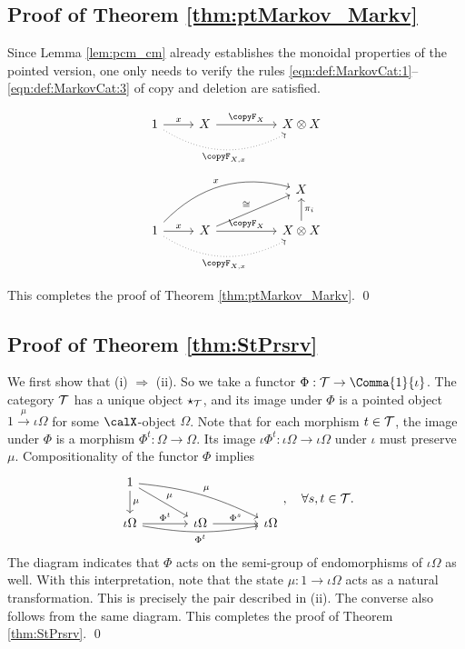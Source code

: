 \documentclass[12pt,oneside,pb-diagram]{article}
\begin{document}
\subsection{Proof of Theorem \ref{thm:ptMarkov_Markv}} \label{sec:proof:ptMarkov_Markv}

Since Lemma \ref{lem:pcm_cm} already establishes the monoidal properties of the pointed version, one only needs to verify the rules \eqref{eqn:def:MarkovCat:1}--\eqref{eqn:def:MarkovCat:3} of copy and deletion are  satisfied.

%
\[\begin{tikzcd}
	1 \arrow[r, "x"] \arrow[rrr, "{\copyF_{X,x}}"', dotted, bend right] & X \arrow[rr, "\copyF_X"] &  & X\otimes X
\end{tikzcd}\]
%
%
\[\begin{tikzcd}
	&  &  & X \\
	1 \arrow[r, "x"] \arrow[rrr, "{\copyF_{X,x}}"', dotted, bend right] \arrow[rrru, "x", bend left] & X \arrow[rr, "\copyF_X"] \arrow[rru, "\cong"] &  & X\otimes X \arrow[u, "\pi_{i}"']
\end{tikzcd}\]
%

This completes the proof of Theorem \ref{thm:ptMarkov_Markv}. \qed
\subsection{Proof of Theorem \ref{thm:StPrsrv}} \label{sec:proof:StPrsrv}

We first show that (i) $\Rightarrow$ (ii). So we take a functor $\Phi : \Time \to \Comma{1}{\iota}$. The category $\mathcal{T}$ has a unique object $\star_{\mathcal{T}}$, and its image under $\Phi$ is a pointed object $1 \xrightarrow{\mu} \iota\Omega$ for some $\calX$-object $\Omega$. Note that for each morphism $t\in \mathcal{T}$, the image under $\Phi$ is a morphism $\Phi^t : \Omega \to \Omega$. Its image $\iota \Phi^t : \iota \Omega \to \iota \Omega$ under $\iota$ must preserve $\mu$. Compositionality of the functor $\Phi$ implies
%
\begin{equation}\label{eqn:thm:StPrsrv}
	\begin{tikzcd} [column sep = large]
		1 \arrow[d, "\mu"] \arrow[dr, "\mu"] \arrow[drr, bend left=10, "\mu"] \\
		\iota \Omega \arrow[r, "\Phi^{t}"] \arrow[rr, bend right=10, "\Phi^{t}"'] & \iota \Omega \arrow[r, "\Phi^{s}"] & \iota \Omega
	\end{tikzcd} , \quad \forall s,t\in \Time.
\end{equation}
%
The diagram indicates that $\Phi$ acts on the semi-group of endomorphisms of $\iota\Omega$ as well. With this interpretation, note that the state $\mu:1\to \iota\Omega$ acts as a natural transformation. This is precisely the pair described in (ii). The converse also follows from the same diagram. This completes the proof of Theorem \ref{thm:StPrsrv}. \qed
\end{document}
